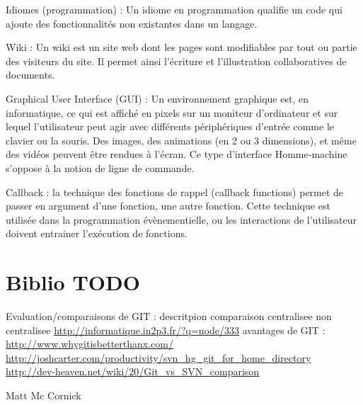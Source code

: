 Idiomes (programmation) :  Un idiome en programmation qualifie un code qui ajoute des fonctionnalités non existantes dans un
langage.

Wiki : Un wiki est un site web dont les pages sont modifiables par tout ou partie des visiteurs du site. Il permet ainsi l'écriture et l'illustration collaboratives de documents.

Graphical User Interface (GUI) : Un environnement graphique est, en informatique, ce qui est affiché en pixels sur un moniteur
d'ordinateur et sur lequel l'utilisateur peut agir avec différents périphériques d'entrée comme le clavier ou la souris. 
Des images, des animations (en 2 ou 3 dimensions), et même des vidéos peuvent être rendues à l'écran.
Ce type d'interface Homme-machine s'oppose à la notion de ligne de commande.

Callback : la technique des fonctions de rappel (callback functions) permet de passer en argument d'une fonction, une autre fonction. 
Cette technique est utilisée dans la programmation évènementielle, ou les interactions de l'utilisateur doivent entrainer l'exécution de fonctions.

\chapter{Biblio TODO}

Evaluation/comparaisons de GIT :
descritpion comparaison centralisee non centralisee
\url{http://informatique.in2p3.fr/?q=node/333}
avantages de GIT :
\url{http://www.whygitisbetterthanx.com/}
\url{http://joshcarter.com/productivity/svn_hg_git_for_home_directory}
\url{http://dev-heaven.net/wiki/20/Git_vs_SVN_comparison}

Matt Mc Cornick

